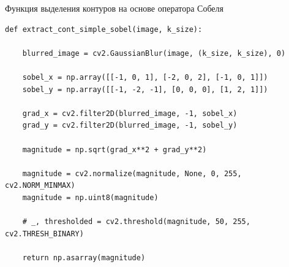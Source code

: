 \documentclass[14pt, russian]{scrartcl}
\begin{document}
\begin{listing}[!htt]
    \caption{Функция выделения контуров на основе оператора Собеля}
    \label{lst:contour_extr_sobel}
    \begin{verbatim}
def extract_cont_simple_sobel(image, k_size):

    blurred_image = cv2.GaussianBlur(image, (k_size, k_size), 0)

    sobel_x = np.array([[-1, 0, 1], [-2, 0, 2], [-1, 0, 1]])
    sobel_y = np.array([[-1, -2, -1], [0, 0, 0], [1, 2, 1]])

    grad_x = cv2.filter2D(blurred_image, -1, sobel_x)
    grad_y = cv2.filter2D(blurred_image, -1, sobel_y)

    magnitude = np.sqrt(grad_x**2 + grad_y**2)

    magnitude = cv2.normalize(magnitude, None, 0, 255, cv2.NORM_MINMAX)
    magnitude = np.uint8(magnitude)

    # _, thresholded = cv2.threshold(magnitude, 50, 255, cv2.THRESH_BINARY)

    return np.asarray(magnitude)
    \end{verbatim}
\end{listing}
\end{document}
